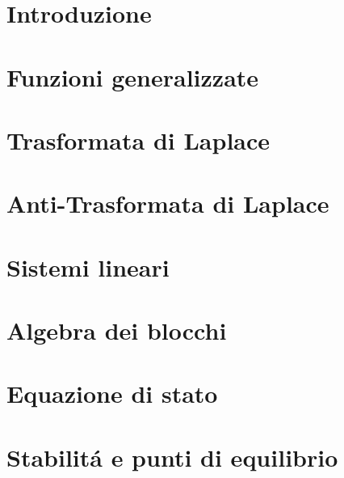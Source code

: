 \documentclass{report}
\begin{document}
	
	
	
	\titleTdS
	\newpage\null\thispagestyle{empty}\newpage
	\tableofcontents
	\pagebreak
	\listofexercises
	\pagebreak
		
	\chapter{Introduzione}
		\setcounter{page}{1}
		
	\pagebreak
	\chapter{Funzioni generalizzate}
		\setcounter{page}{1}
	
	\pagebreak
	\chapter{Trasformata di Laplace}
		\setcounter{page}{1}
	
	\pagebreak
	\chapter{Anti-Trasformata di Laplace}
		\setcounter{page}{1}
	
	\pagebreak
	\chapter{Sistemi lineari}
		\setcounter{page}{1}
	
	
	
	
	
	\pagebreak
	\chapter{Algebra dei blocchi}
		\setcounter{page}{1}
	
	
	\pagebreak
	\chapter{Equazione di stato}
		\setcounter{page}{1}
	
	\pagebreak
	\chapter{Stabilit\'a e punti di equilibrio}
		\setcounter{page}{1}
	
	\pagebreak
\end{document}
